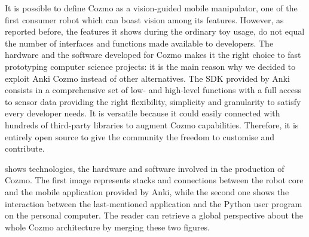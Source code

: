 It is possible to define Cozmo as a vision-guided mobile manipulator, one of the first consumer robot which can boast vision among its features. However, as reported before, the features it shows during the ordinary toy usage, do not equal the number of interfaces and functions made available to developers. The hardware and the software developed for Cozmo makes it the right choice to fast prototyping computer science projects: it is the main reason why we decided to exploit Anki Cozmo instead of other alternatives.
The SDK provided by Anki consists in a comprehensive set of low- and high-level functions with a full access to sensor data providing the right flexibility, simplicity and granularity to satisfy every developer needs. It is versatile because it could easily connected with hundreds of third-party libraries to augment Cozmo capabilities. Therefore, it is entirely open source to give the community the freedom to customise and contribute.

 shows technologies, the hardware and software involved in the production of Cozmo. The first image represents stacks and connections between the robot core and the mobile application provided by Anki, while the second one shows the interaction between the last-mentioned application and the Python user program on the personal computer. The reader can retrieve a global perspective about the whole Cozmo architecture by merging these two figures.

